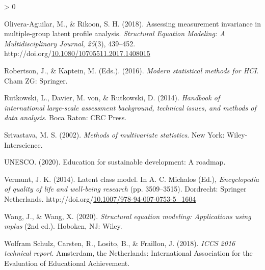 \documentclass[12pt,a4paper,oneside]{reedthesis}
\newlength{\cslhangindent}
\newenvironment{CSLReferences}[2] %
 {%
  \setlength{\parindent}{0pt}
  \ifodd #1 \everypar{\setlength{\hangindent}{\cslhangindent}}\ignorespaces\fi
  \ifnum #2 > 0
  \setlength{\parskip}{#2\baselineskip}
  \fi
 }%
 {}
\begin{document}
\begin{CSLReferences}{1}{0}
\leavevmode\hypertarget{ref-olivera-aguilar_assessing_2018}{}%
Olivera-Aguilar, M., \& Rikoon, S. H. (2018). Assessing measurement invariance in multiple-group latent profile analysis. \emph{Structural Equation Modeling: A Multidisciplinary Journal}, \emph{25}(3), 439--452. http://doi.org/\href{https://doi.org/10.1080/10705511.2017.1408015}{10.1080/10705511.2017.1408015}

\leavevmode\hypertarget{ref-robertson_modern_2016}{}%
Robertson, J., \& Kaptein, M. (Eds.). (2016). \emph{Modern statistical methods for {HCI}}. Cham {ZG}: Springer.

\leavevmode\hypertarget{ref-rutkowski_handbook_2014}{}%
Rutkowski, L., Davier, M. von, \& Rutkowski, D. (2014). \emph{Handbook of international large-scale assessment background, technical issues, and methods of data analysis}. Boca Raton: {CRC} Press.

\leavevmode\hypertarget{ref-srivastava_methods_2002}{}%
Srivastava, M. S. (2002). \emph{Methods of multivariate statistics}. New York: Wiley-Interscience.

\leavevmode\hypertarget{ref-unesco_education_2020}{}%
UNESCO. (2020). Education for sustainable development: A roadmap.

\leavevmode\hypertarget{ref-michalos_latent_2014}{}%
Vermunt, J. K. (2014). Latent class model. In A. C. Michalos (Ed.), \emph{Encyclopedia of quality of life and well-being research} (pp. 3509--3515). Dordrecht: Springer Netherlands. http://doi.org/\href{https://doi.org/10.1007/978-94-007-0753-5_1604}{10.1007/978-94-007-0753-5\_1604}

\leavevmode\hypertarget{ref-wang_structural_2020}{}%
Wang, J., \& Wang, X. (2020). \emph{Structural equation modeling: Applications using mplus} (2nd ed.). Hoboken, {NJ}: Wiley.

\leavevmode\hypertarget{ref-wolfram_schulz_iccs_2018}{}%
Wolfram Schulz, Carsten, R., Losito, B., \& Fraillon, J. (2018). \emph{{ICCS} 2016 technical report}. Amsterdam, the Netherlands: International Association for the Evaluation of Educational Achievement.

\end{CSLReferences}

\end{document}
